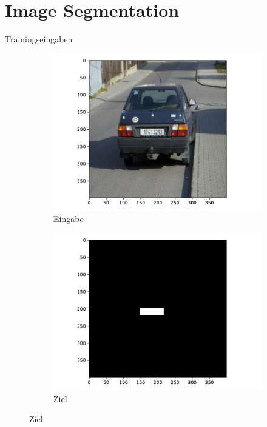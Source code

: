 \section{Image Segmentation}

\begin{frame}{Trainingseingaben}
    \begin{figure}
        \centering
        \begin{subfigure}{0.495\textwidth}
            \centering
            \includegraphics[width=\textwidth]{img/model_demo_1}
            \caption{Eingabe}
        \end{subfigure}
        \begin{subfigure}{0.495\textwidth}
            \centering
            \includegraphics[width=\textwidth]{img/model_demo_2}
            \caption{Ziel}
        \end{subfigure}
    \end{figure}
\end{frame}

